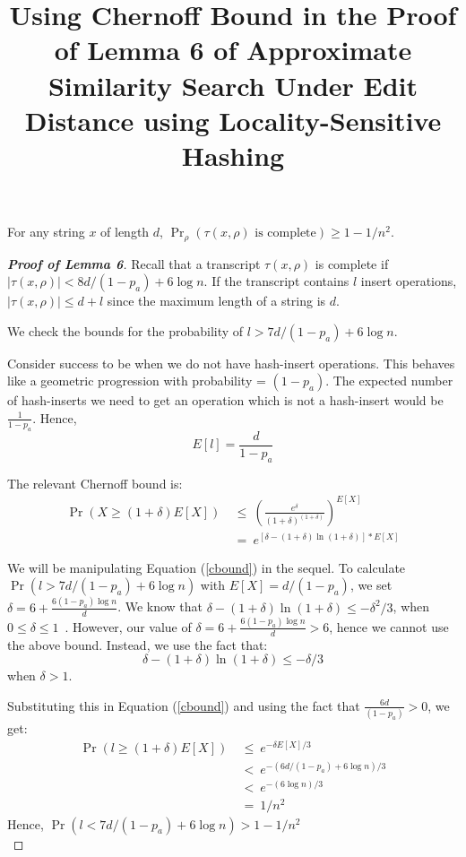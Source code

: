 \documentclass{article}
\title{Using Chernoff Bound in the Proof of Lemma 6 of Approximate Similarity Search Under Edit Distance using Locality-Sensitive Hashing}
\author{}
\date{}
\begin{document}
\maketitle

\begin{lem}
For any string $x$ of length $d$,
$\Pr_\rho  (\tau(x, \rho) \text{ is complete}) \geq 1-1/n^2$.\\
\end{lem}

\begin{proof}[\textbf{Proof of Lemma 6}]

Recall that a transcript $\tau(x, \rho)$ is complete if
$|\tau(x, \rho)| < 8d/(1-p_a)+6\log n$.
If the transcript contains $l$ insert operations, $|\tau(x,\rho)| \leq d+l$
since the maximum length of a string is $d$.

\noindent
We check the bounds for the probability of $l>7d/(1-p_a)+6\log n$.

Consider success to be when we do not have hash-insert operations. This
behaves like a geometric progression with probability = $(1-p_a)$. The
expected number of hash-inserts we need to get an operation which is not a
hash-insert would be $\frac{1}{1-p_a}$.
Hence,
\[E[l] = \frac{d}{1-p_a}\]

\noindent
The relevant Chernoff bound is:
\begin{align}
\Pr(X \geq (1+\delta)E[X]) & ~\leq ~( \frac{e^\delta}{(1+\delta)^(1+\delta)} )^{E[X]}  \nonumber \\
& ~= ~e^{[\delta - (1+\delta)\ln(1+\delta)]*E[X]} \label{cbound}
\end{align}

\noindent
We will be manipulating Equation (\ref{cbound}) in the sequel. To calculate
$\Pr(l > 7d/(1-p_a) + 6\log n)$ with $E[X]=d/(1-p_a)$, we set $\delta = 6 + \frac{6(1-p_a)\log n}{d}$.
We know that
$\delta - (1+\delta) \ln(1+\delta) \leq -\delta ^2/3 $, when $0 \leq \delta \leq 1$~\cite{HR90}.
However, our value of $\delta = 6 + \frac{6(1-p_a)\log n}{d} > 6$, hence we cannot use the above bound. Instead, we use the fact that:
\[\delta - (1+\delta)\ln(1+\delta) \leq -\delta/3\]
when $\delta>1$.

\noindent
Substituting this in Equation (\ref{cbound}) and using the fact that $\frac{6d}{(1-p_a)} > 0$, we get:
\begin{align}
\Pr(l \geq (1+\delta)E[X]) & ~\leq ~e^{-\delta E[X]/3} \nonumber \\
& ~<~ e^{-(6d/(1-p_a)+6\log n)/3}  \nonumber \\
& ~<~ e^{-(6\log n)/3} \nonumber \\
& ~=~ 1/n^2
\end{align}
Hence,
$\Pr(l < 7d/(1-p_a) + 6\log n) > 1-1/n^2$\\

\end{proof}




\end{document}
